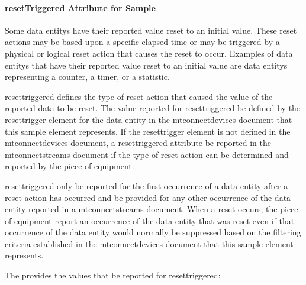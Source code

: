 \documentclass{mtconnect}	%
\begin{document}
\paragraph{resetTriggered Attribute for Sample}\mbox{}

Some \glspl{data entity} \may have their reported value reset to an initial value.  These reset actions may be based upon a specific elapsed time or may be triggered by a physical or logical reset action that causes the reset to occur.   Examples of \glspl{data entity} that \may have their reported value reset to an initial value are \glspl{data entity} representing a counter, a timer, or a statistic.

\gls{resettriggered} defines the \gls{type} of reset action that caused the value of the reported data to be reset.  The value reported for \gls{resettriggered} \may be defined by the \gls{resettrigger} element for the \gls{data entity} in the \gls{mtconnectdevices} document that this \gls{sample} element represents.  If the \gls{resettrigger} element is not defined in the \gls{mtconnectdevices} document, a \gls{resettriggered} attribute \should be reported in the \gls{mtconnectstreams} document if the \gls{type} of reset action can be determined and reported by the piece of equipment.

\gls{resettriggered} \must only be reported for the first occurrence of a \gls{data entity} after a reset action has occurred and \mustnot be provided for any other occurrence of the \gls{data entity} reported in a \gls{mtconnectstreams} document.  When a reset occurs, the piece of equipment \must report an occurrence of the \gls{data entity} that was reset even if that occurrence of the \gls{data entity} would normally be suppressed based on the filtering criteria established in the \gls{mtconnectdevices} document that this \gls{sample} element represents.

The  provides the values that \may be reported for \gls{resettriggered}:    
\end{document}
